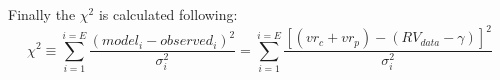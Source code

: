 \documentclass[12pt,preprint]{aastex}
\begin{document}






Finally the ${\chi}^{2} $ is calculated following:
\begin{equation}\label{eq:33}
{\chi}^{2} \equiv  \sum_{i=1}^{i=E} \frac{(model_i - observed_i)^{2}}{\sigma^{2}_i} = \sum_{i=1}^{i=E} \frac{[(vr_c+vr_p) - (RV_{data}-\gamma)]^{2}}{\sigma^{2}_i}
\end{equation}
\end{document}

